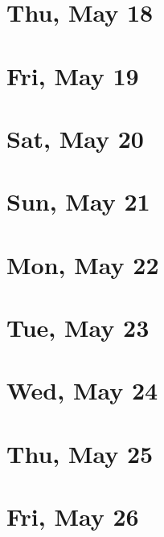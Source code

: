 	\section{Thu, May 18}
		
		
	\section{Fri, May 19}
		
		
	\section{Sat, May 20}
		
		
	\section{Sun, May 21}
		
		
	\section{Mon, May 22}
		
		
	\section{Tue, May 23}
		
		
	\section{Wed, May 24}
		
		
	\section{Thu, May 25}
		
		
	\section{Fri, May 26}
		
		
